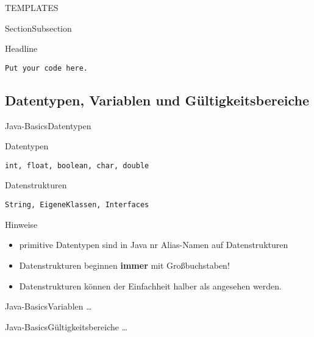 TEMPLATES

\begin{frame}{Section}{Subsection}
\end{frame}

\begin{block}{Headline}
\end{block}

\begin{lstlisting}
Put your code here.
\end{lstlisting}

\subsection{Datentypen, Variablen und G\"ultigkeitsbereiche}
\begin{frame}[shrink]{Java-Basics}{Datentypen}
    \begin{block}{ Datentypen}
        \begin{lstlisting}
int, float, boolean, char, double
        \end{lstlisting}
    \end{block}
    \begin{block}{Datenstrukturen}
        \begin{lstlisting}
String, EigeneKlassen, Interfaces
        \end{lstlisting}
    \end{block}
    \begin{exampleblock}{Hinweise}
        \begin{itemize}
            \item primitive Datentypen sind in Java nr Alias-Namen auf Datenstrukturen
            \item Datenstrukturen beginnen \textbf{immer} mit Gro\ss buchstaben!
            \item Datenstrukturen können der Einfachheit halber als  angesehen werden. 
        \end{itemize}
    \end{exampleblock}
\end{frame}

\begin{frame}{Java-Basics}{Variablen}
    \ldots
\end{frame}

\begin{frame}{Java-Basics}{G\"ultigkeitsbereiche}
    \ldots
\end{frame}



